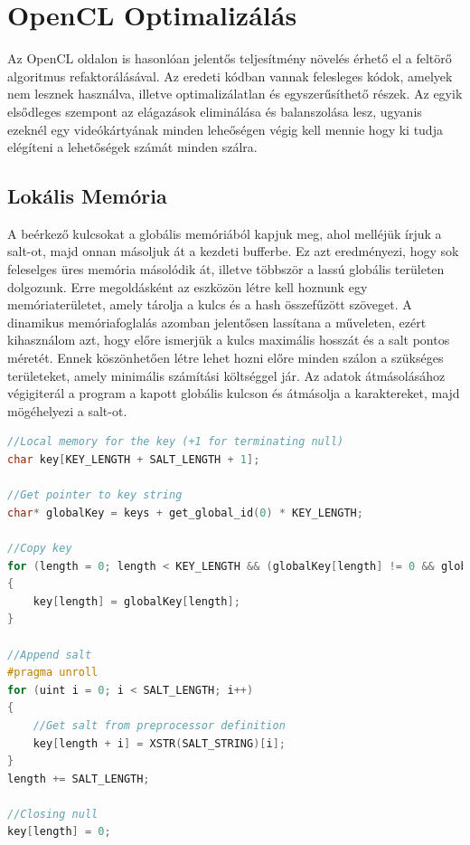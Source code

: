 \section{OpenCL Optimalizálás}

Az OpenCL oldalon is hasonlóan jelentős teljesítmény növelés érhető el a feltörő algoritmus refaktorálásával. Az eredeti kódban vannak felesleges kódok, amelyek nem lesznek használva, illetve optimalizálatlan és egyszerűsíthető részek. Az egyik elsődleges szempont az elágazások eliminálása és balanszolása lesz, ugyanis ezeknél egy videókártyának minden leheőségen végig kell mennie hogy ki tudja elégíteni a lehetőségek számát minden szálra. 




\subsection{Lokális Memória}

A beérkező kulcsokat a globális memóriából kapjuk meg, ahol melléjük írjuk a salt-ot, majd onnan másoljuk át a kezdeti bufferbe. Ez azt eredményezi, hogy sok feleselges üres memória másolódik át, illetve többször a lassú globális területen dolgozunk. Erre megoldásként az eszközön létre kell hoznunk egy memóriaterületet, amely tárolja a kulcs és a hash összefűzött szöveget. A dinamikus memóriafoglalás azomban jelentősen lassítana a műveleten, ezért kihasználom azt, hogy előre ismerjük a kulcs maximális hosszát és a salt pontos méretét. Ennek köszönhetően létre lehet hozni előre minden szálon a szükséges területeket, amely minimális számítási költséggel jár. Az adatok átmásolásához végigiterál a program a kapott globális kulcson és átmásolja a karaktereket, majd mögéhelyezi a salt-ot.

\begin{lstlisting}[language={C++}]
//Local memory for the key (+1 for terminating null)
char key[KEY_LENGTH + SALT_LENGTH + 1];

//Get pointer to key string
char* globalKey = keys + get_global_id(0) * KEY_LENGTH;

//Copy key
for (length = 0; length < KEY_LENGTH && (globalKey[length] != 0 && globalKey[length] != '\n'); length++)
{
    key[length] = globalKey[length];
}

//Append salt
#pragma unroll
for (uint i = 0; i < SALT_LENGTH; i++)
{
    //Get salt from preprocessor definition
    key[length + i] = XSTR(SALT_STRING)[i];
}
length += SALT_LENGTH;

//Closing null
key[length] = 0;
\end{lstlisting}

